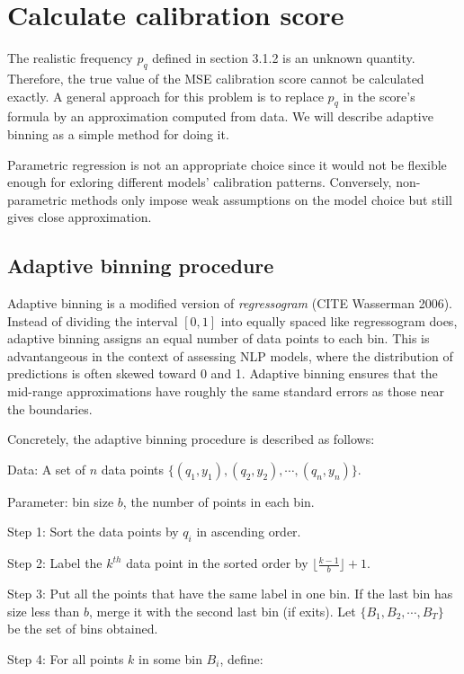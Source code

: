 \section{Calculate calibration score}

The realistic frequency $p_q$ defined in section 3.1.2 is an unknown quantity. Therefore, the true value of the MSE calibration score cannot be calculated exactly. A general approach for this problem is to replace $p_q$ in the score's formula by an approximation computed from data. We will describe adaptive binning as a simple method for doing it.

Parametric regression is not an appropriate choice since it would not be flexible enough for exloring different models' calibration patterns. Conversely, non-parametric methods only impose weak assumptions on the model choice but still gives close approximation.

\subsection{Adaptive binning procedure}

Adaptive binning is a modified version of \textit{regressogram} (CITE Wasserman 2006). Instead of dividing the interval $[0, 1]$ into equally spaced like regressogram does, adaptive binning assigns an equal number of data points to each bin. This is advantangeous in the context of assessing NLP models, where the distribution of predictions is often skewed toward 0 and 1. Adaptive binning ensures that the mid-range approximations have roughly the same standard errors as those near the boundaries.

Concretely, the adaptive binning procedure is described as follows:

Data: A set of $n$ data points $\{(q_1, y_1), (q_2, y_2), \cdots, (q_n, y_n)\}$.

Parameter: bin size $b$, the number of points in each bin.

Step 1: Sort the data points by $q_i$ in ascending order.

Step 2: Label the $k^{th}$ data point in the sorted order by $\lfloor \frac{k - 1}{b}\rfloor + 1$.

Step 3: Put all the points that have the same label in one bin. If the last bin has size less than $b$, merge it with the second last bin (if exits). Let $\{B_1, B_2, \cdots, B_T\}$ be the set of bins obtained.  

Step 4: For all points $k$ in some bin $B_i$, define:

